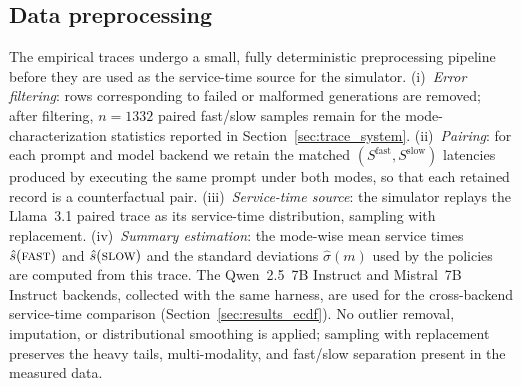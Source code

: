 \documentclass[fleqn,12pt,lineno]{wlpeerj}
\begin{document}
\subsection{Data preprocessing}
\label{sec:preprocessing}
The empirical traces undergo a small, fully deterministic preprocessing
pipeline before they are used as the service-time source for the
simulator. (i)~\emph{Error filtering}: rows corresponding to failed or
malformed generations are removed; after filtering, $n=1332$ paired
fast/slow samples remain for the mode-characterization statistics
reported in Section~\ref{sec:trace_system}. (ii)~\emph{Pairing}: for
each prompt and model backend we retain the matched
$(S^{\text{fast}}, S^{\text{slow}})$ latencies produced by executing the
same prompt under both modes, so that each retained record is a
counterfactual pair. (iii)~\emph{Service-time source}: the simulator
replays the Llama~3.1 paired trace as its service-time distribution,
sampling with replacement. (iv)~\emph{Summary estimation}: the
mode-wise mean service times $\hat{s}(\textsc{fast})$ and
$\hat{s}(\textsc{slow})$ and the standard deviations $\hat{\sigma}(m)$
used by the policies are computed from this trace. The Qwen~2.5~7B
Instruct and Mistral~7B Instruct backends, collected with the same
harness, are used for the cross-backend service-time comparison
(Section~\ref{sec:results_ecdf}). No outlier removal, imputation, or
distributional smoothing is applied; sampling with replacement preserves
the heavy tails, multi-modality, and fast/slow separation present in the
measured data.
\end{document}
